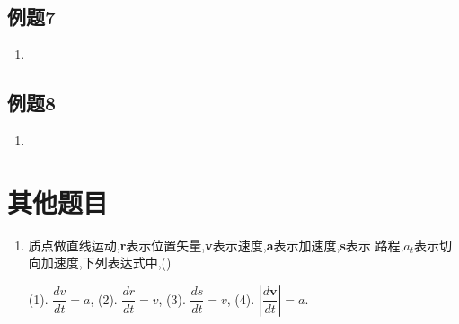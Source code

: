 \subsection{例题7}

\begin{enumerate}
	
	\item 
	
\end{enumerate}



\subsection{例题8}

\begin{enumerate}
	
	\item 
\end{enumerate}









\section{其他题目}

\begin{enumerate}

\item[\textbf{1-7}] 质点做直线运动,\textbf{r}表示位置矢量,\textbf{v}表示速度,\textbf{a}表示加速度,\textbf{s}表示 路程,$a_t$表示切向加速度,下列表达式中,(\quad)

(1). $\dfrac{dv}{dt} = a$,
(2). $\dfrac{{dr}}{dt} = {v}$,
(3). $\dfrac{ds}{dt} = v$,
(4). $\left| \dfrac{d\mathbf{v}}{dt} \right| = a$.







\end{enumerate}
